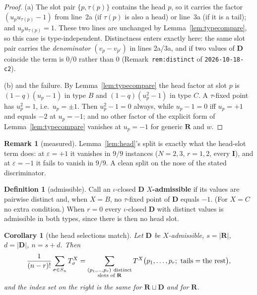 \documentclass[11pt]{article}
\newtheorem{cor}[thm]{Corollary}
\theoremstyle{definition}
\newtheorem{defn}[thm]{Definition}
\newtheorem{rem}[thm]{Remark}
\newcommand{\bI}{\mathbf{I}}
\newcommand{\bD}{\mathbf{D}}
\newcommand{\bR}{\mathbf{R}}
\begin{document}
\begin{proof}
(a) The slot pair $\{p,\tau(p)\}$ contains the head $p$, so it carries the
factor $(u_pu_{\tau(p)}-1)$ from line~2a (if $\tau(p)$ is also a head) or
line~3a (if it is a tail); and $u_pu_{\tau(p)}=1$.  These two lines are
unchanged by Lemma~\ref{lem:typecompare}, so this case is type-independent.
Distinctness enters exactly here: the same slot pair carries the
\emph{denominator} $(v_p-v_{p'})$ in lines 2a/3a, and if two values of $\bD$
coincide the term is $0/0$ rather than $0$
(Remark~\texttt{rem:distinct} of \texttt{2026-10-18-c2}).

(b) and the failure.  By Lemma~\ref{lem:typecompare} the head factor at slot $p$
is $(1-q)(u_p-1)$ in type $B$ and $(1-q)(u_p^{2}-1)$ in type $C$.  A
$\tau$-fixed point has $u_p^{2}=1$, i.e.\ $u_p=\pm1$.  Then $u_p^{2}-1=0$
always, while $u_p-1=0$ iff $u_p=+1$ and equals $-2$ at $u_p=-1$; and no other
factor of the explicit form of Lemma~\ref{lem:typecompare} vanishes at $u_p=-1$
for generic $\bR$ and $w$.
\end{proof}

\begin{rem}[measured]
Lemma~\ref{lem:head}'s split is exactly what the head-slot term does: at
$\varepsilon=+1$ it vanishes in $9/9$ instances ($N=2,3$, $r=1,2$, every $\bI$),
and at $\varepsilon=-1$ it fails to vanish in $9/9$.  A clean split on the
nose of the stated discriminator.
\end{rem}

\begin{defn}[admissible]\label{def:adm}
Call an $\iota$-closed $\bD$ \textbf{$X$-admissible} if its values are pairwise
distinct and, when $X=B$, no $\tau$-fixed point of $\bD$ equals $-1$.  (For
$X=C$ no extra condition.)  When $r=0$ every $\iota$-closed $\bD$ with distinct
values is admissible in both types, since there is then no head slot.
\end{defn}

\begin{cor}[the head selections match]\label{cor:heads}
Let $\bD$ be $X$-admissible, $s=|\bR|$, $d=|\bD|$, $n=s+d$.  Then
\[
  \frac{1}{(n-r)!}\sum_{\sigma\in S_n}T^{X}_\sigma
  =\sum_{\substack{(p_1,\dots,p_r)\ \textup{distinct}\\ \textup{slots of }\bR}}
      T^{X}\bigl(p_1,\dots,p_r;\ \textup{tails}=\textup{the rest}\bigr),
\]
and the index set on the right is the same for $\bR\sqcup\bD$ and for $\bR$.
\end{cor}
\end{document}
